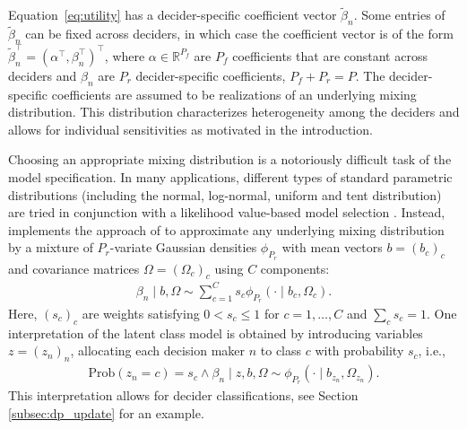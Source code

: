\documentclass[article,shortnames]{jss}
\begin{document}
Equation~\ref{eq:utility} has a decider-specific coefficient vector $\tilde{\beta}_n$. Some entries of $\tilde{\beta}_n$ can be fixed across deciders, in which case the coefficient vector is of the form $\tilde{\beta}_n^\top = (\alpha^\top, \beta_n^\top)^\top$, where $\alpha \in \mathbb{R}^{P_f}$ are $P_f$ coefficients that are constant across deciders and $\beta_n$ are $P_r$ decider-specific coefficients, $P_f + P_r = P$. The decider-specific coefficients are assumed to be realizations of an underlying mixing distribution. This distribution characterizes heterogeneity among the deciders and allows for individual sensitivities as motivated in the introduction.

Choosing an appropriate mixing distribution is a notoriously difficult task of the model specification. In many applications, different types of standard parametric distributions (including the normal, log-normal, uniform and tent distribution) are tried in conjunction with a likelihood value-based model selection \citep[pp.\ 136 ff.]{Train:2009}. Instead,  implements the approach of \cite{Oelschlaeger:2020} to approximate any underlying mixing distribution by a mixture of $P_r$-variate Gaussian densities $\phi_{P_r}$ with mean vectors $b=(b_c)_{c}$ and covariance matrices $\Omega=(\Omega_c)_{c}$ using $C$ components:
%
\begin{align*}
\beta_n\mid b,\Omega \sim \sum_{c=1}^{C} s_c \phi_{P_r} (\cdot \mid b_c,\Omega_c).
\end{align*}
%
Here, $(s_c)_{c}$ are weights satisfying $0 < s_c\leq 1$ for $c=1,\dots,C$ and $\sum_c s_c=1$. One interpretation of the latent class model is obtained by introducing variables $z=(z_n)_n$, allocating each decision maker $n$ to class $c$ with probability $s_c$, i.e.,
%
\begin{align*}
\text{Prob}(z_n=c)=s_c \land \beta_n \mid z,b,\Omega \sim \phi_{P_r}(\cdot \mid b_{z_n},\Omega_{z_n}).
\end{align*}
%
This interpretation allows for decider classifications, see Section \ref{subsec:dp_update} for an example.
\end{document}
